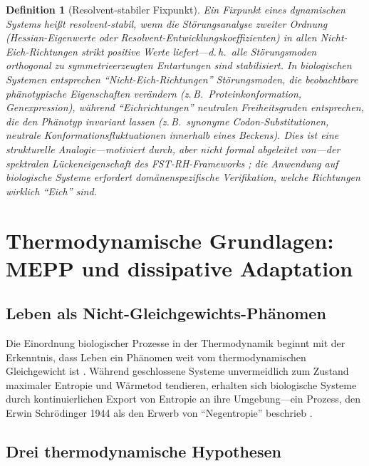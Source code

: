 \documentclass[12pt,a4paper]{article}
\newtheorem{definition}{Definition}
\theoremstyle{remark}
\begin{document}
\begin{definition}[Resolvent-stabiler Fixpunkt]
\label{def:resolvent-stable}
Ein Fixpunkt eines dynamischen Systems hei\ss{}t \emph{resolvent-stabil}, wenn die St\"orungsanalyse zweiter Ordnung (Hessian-Eigenwerte oder Resolvent-Entwicklungskoeffizienten) in allen Nicht-Eich-Richtungen strikt positive Werte liefert---d.\,h.\ alle St\"orungsmoden orthogonal zu symmetrieerzeugten Entartungen sind stabilisiert. In biologischen Systemen entsprechen ``Nicht-Eich-Richtungen'' St\"orungsmoden, die beobachtbare ph\"anotypische Eigenschaften ver\"andern (z.\,B.\ Proteinkonformation, Genexpression), w\"ahrend ``Eichrichtungen'' neutralen Freiheitsgraden entsprechen, die den Ph\"anotyp invariant lassen (z.\,B.\ synonyme Codon-Substitutionen, neutrale Konformationsfluktuationen innerhalb eines Beckens). Dies ist eine strukturelle Analogie---motiviert durch, aber nicht formal abgeleitet von---der spektralen L\"uckeneigenschaft des FST-RH-Frameworks \citep{GeigerRH2026b}; die Anwendung auf biologische Systeme erfordert dom\"anenspezifische Verifikation, welche Richtungen wirklich ``Eich'' sind.
\end{definition}

\section{Thermodynamische Grundlagen: MEPP und dissipative Adaptation}
\label{sec:thermodynamics}

\subsection{Leben als Nicht-Gleichgewichts-Ph\"anomen}

Die Einordnung biologischer Prozesse in der Thermodynamik beginnt mit der Erkenntnis, dass Leben ein Ph\"anomen weit vom thermodynamischen Gleichgewicht ist \citep{EcosystemMEPP}. W\"ahrend geschlossene Systeme unvermeidlich zum Zustand maximaler Entropie und W\"armetod tendieren, erhalten sich biologische Systeme durch kontinuierlichen Export von Entropie an ihre Umgebung---ein Prozess, den Erwin Schr\"odinger 1944 als den Erwerb von ``Negentropie'' beschrieb \citep{SchoolBiologicalPhysics,EcosystemMEPP}.

\subsection{Drei thermodynamische Hypothesen}
\end{document}

